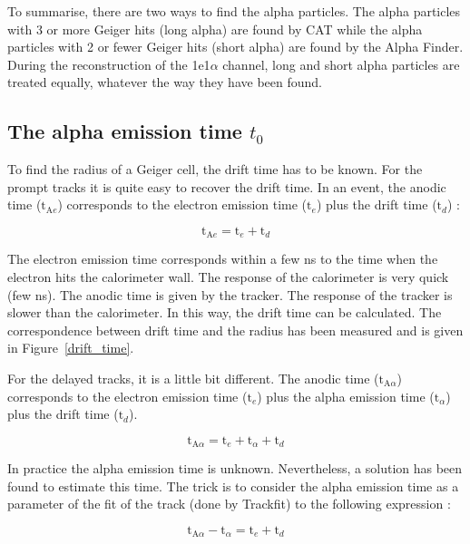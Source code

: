 \documentclass[main.tex]{subfiles}
\begin{document}
\bigskip


\NI To summarise, there are two ways to find the alpha particles. The alpha particles with 3 or more Geiger hits (long alpha)  are found by CAT while the alpha particles with 2 or fewer Geiger hits (short alpha) are found by the Alpha Finder. During the reconstruction of the 1e1$\alpha$ channel, long and short alpha particles are treated equally, whatever the way they have been found.

  
\subsection{The alpha emission time $t_0$}


To find the radius of a Geiger cell, the drift time has to be known. For the prompt tracks it is quite easy to recover the drift time. In an event, the anodic time ($\text{t}_{\text{A}e}$) corresponds to the electron emission time ($ \text{t}_e$) plus the drift time ($\text{t}_d$) :


$$\text{t}_{\text{A}e} = \text{t}_e + \text{t}_d$$


\noindent The electron emission time corresponds within a few ns to the time when the electron hits the calorimeter wall. The response of the calorimeter is very quick (few ns). The anodic time is given by the tracker. The response of the tracker is slower than the calorimeter. In this way, the drift time can be calculated. The correspondence between drift time and the radius has been measured and is given in Figure~\ref{drift_time}.


\bigskip


\noindent For the delayed tracks, it is a little bit different. The anodic time ($\text{t}_{\text{A}\alpha}$) corresponds to the electron emission time ($ \text{t}_e$) plus the alpha emission time ($ \text{t}_\alpha$) plus the drift time ($\text{t}_d$). 


$$\text{t}_{\text{A}\alpha} = \text{t}_e + \text{t}_\alpha + \text{t}_d$$


\noindent In practice the alpha emission time is unknown. Nevertheless, a solution has been found to estimate this time. The trick is to consider the alpha emission time as a parameter of the fit of the track (done by Trackfit) to the following expression :


$$\text{t}_{\text{A}\alpha} - \text{t}_\alpha =  \text{t}_e  + \text{t}_d$$
\end{document}
